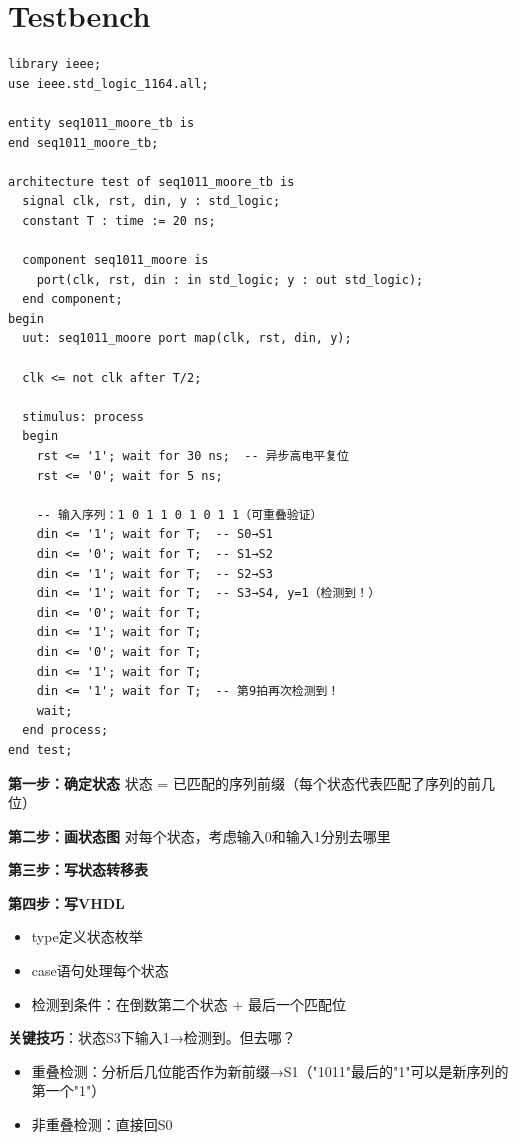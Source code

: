 \section{Testbench}

\begin{lstlisting}[caption={Moore型1011序列检测器Testbench（异步高电平复位）}]
library ieee;
use ieee.std_logic_1164.all;

entity seq1011_moore_tb is
end seq1011_moore_tb;

architecture test of seq1011_moore_tb is
  signal clk, rst, din, y : std_logic;
  constant T : time := 20 ns;

  component seq1011_moore is
    port(clk, rst, din : in std_logic; y : out std_logic);
  end component;
begin
  uut: seq1011_moore port map(clk, rst, din, y);

  clk <= not clk after T/2;

  stimulus: process
  begin
    rst <= '1'; wait for 30 ns;  -- 异步高电平复位
    rst <= '0'; wait for 5 ns;

    -- 输入序列：1 0 1 1 0 1 0 1 1（可重叠验证）
    din <= '1'; wait for T;  -- S0→S1
    din <= '0'; wait for T;  -- S1→S2
    din <= '1'; wait for T;  -- S2→S3
    din <= '1'; wait for T;  -- S3→S4, y=1（检测到！）
    din <= '0'; wait for T;
    din <= '1'; wait for T;
    din <= '0'; wait for T;
    din <= '1'; wait for T;
    din <= '1'; wait for T;  -- 第9拍再次检测到！
    wait;
  end process;
end test;
\end{lstlisting}

\begin{examtip}[序列检测器秒杀法]
\textbf{第一步：确定状态}
状态 = 已匹配的序列前缀（每个状态代表匹配了序列的前几位）

\textbf{第二步：画状态图}
对每个状态，考虑输入0和输入1分别去哪里

\textbf{第三步：写状态转移表}

\textbf{第四步：写VHDL}
\begin{itemize}
  \item type定义状态枚举
  \item case语句处理每个状态
  \item 检测到条件：在倒数第二个状态 + 最后一个匹配位
\end{itemize}

\textbf{关键技巧}：状态S3下输入1→检测到。但去哪？
\begin{itemize}
  \item 重叠检测：分析后几位能否作为新前缀→S1（"1011"最后的"1"可以是新序列的第一个"1"）
  \item 非重叠检测：直接回S0
\end{itemize}
\end{examtip}


